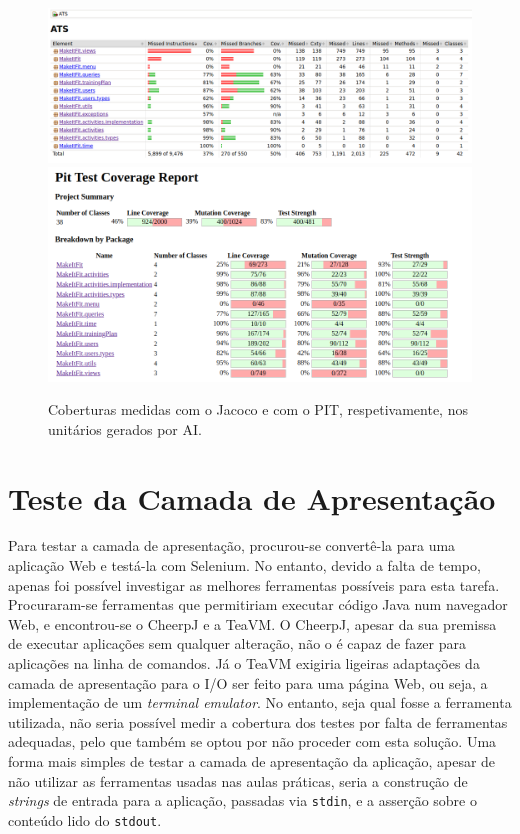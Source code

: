 \documentclass[12pt, a4paper]{article}
\begin{document}
\begin{figure}[H]
    \includegraphics[width=\textwidth]{res/AiJacoco.png}
    \includegraphics[width=\textwidth]{res/AiPit.png}
    \caption{Coberturas medidas com o Jacoco e com o PIT, respetivamente, nos unitários gerados por AI.}
\end{figure}

\section{Teste da Camada de Apresentação}

Para testar a camada de apresentação, procurou-se convertê-la para uma aplicação Web e testá-la
com Selenium. No entanto, devido a falta de tempo, apenas foi possível investigar as melhores
ferramentas possíveis para esta tarefa. Procuraram-se ferramentas que permitiriam executar código
Java num navegador Web, e encontrou-se o CheerpJ e a TeaVM. O CheerpJ, apesar da sua premissa de
executar aplicações sem qualquer alteração, não o é capaz de fazer para aplicações na linha de
comandos. Já o TeaVM exigiria ligeiras adaptações da camada de apresentação para o I/O ser feito
para uma página Web, ou seja, a implementação de um \emph{terminal emulator}. No entanto, seja qual
fosse a ferramenta utilizada, não seria possível medir a cobertura dos testes por falta de
ferramentas adequadas, pelo que também se optou por não proceder com esta solução. Uma forma mais
simples de testar a camada de apresentação da aplicação, apesar de não utilizar as ferramentas
usadas nas aulas práticas, seria a construção de \emph{strings} de entrada para a aplicação,
passadas via \texttt{stdin}, e a asserção sobre o conteúdo lido do \texttt{stdout}.
\end{document}
